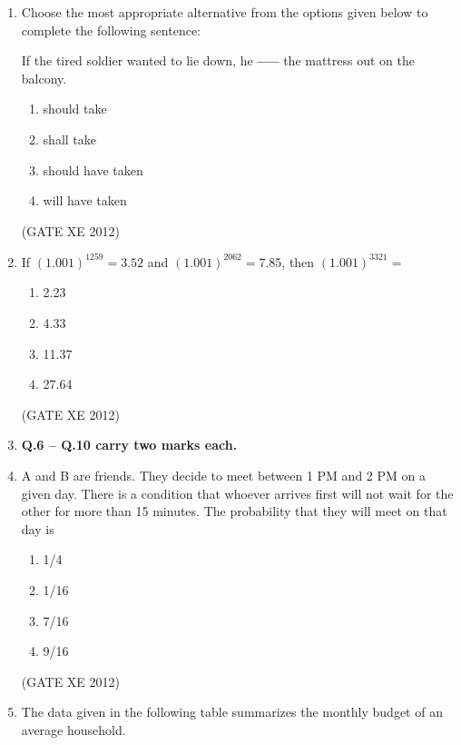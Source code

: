\documentclass[12pt]{article}
\begin{document}
\begin{enumerate}
(GATE XE 2012)

\item Choose the most appropriate alternative from the options given below to complete the following sentence:  

If the tired soldier wanted to lie down, he \textbf{-----} the mattress out on the balcony.  

\begin{enumerate}
\item should take
\item shall take
\item should have taken
\item will have taken
\end{enumerate}

(GATE XE 2012)

\item If $(1.001)^{1259} = 3.52$ and $(1.001)^{2062} = 7.85$, then $(1.001)^{3321} =$  

\begin{multicols}{4}
\begin{enumerate}
\item 2.23
\item 4.33
\item 11.37
\item 27.64
\end{enumerate}
\end{multicols}

(GATE XE 2012)



\item[] \textbf{Q.6 -- Q.10 carry two marks each.}


\item A and B are friends. They decide to meet between 1 PM and 2 PM on a given day.  
There is a condition that whoever arrives first will not wait for the other for more than 15 minutes.  
The probability that they will meet on that day is  

\begin{multicols}{4}
\begin{enumerate}
\item 1/4
\item 1/16
\item 7/16
\item 9/16
\end{enumerate}
\end{multicols}

(GATE XE 2012)

\item The data given in the following table summarizes the monthly budget of an average household.  


\end{enumerate}
\end{document}
